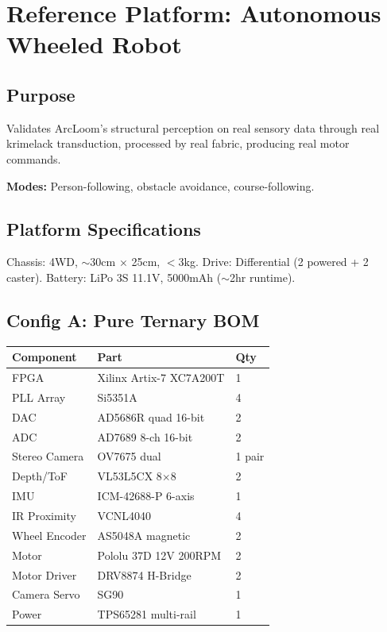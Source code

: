 \documentclass[11pt, a4paper]{report}
\begin{document}
\chapter{Reference Platform: Autonomous Wheeled Robot}

\section{Purpose}

Validates ArcLoom's structural perception on real sensory data through
real krimelack transduction, processed by real fabric, producing real
motor commands.

\textbf{Modes:} Person-following, obstacle avoidance, course-following.

\section{Platform Specifications}

Chassis: 4WD, $\sim$30cm $\times$ 25cm, $<$3kg.
Drive: Differential (2 powered + 2 caster).
Battery: LiPo 3S 11.1V, 5000mAh ($\sim$2hr runtime).

\section{Config A: Pure Ternary BOM}

\begin{center}
\begin{tabular}{@{}lll@{}}
\toprule
\textbf{Component} & \textbf{Part} & \textbf{Qty} \\
\midrule
FPGA & Xilinx Artix-7 XC7A200T & 1 \\
PLL Array & Si5351A & 4 \\
DAC & AD5686R quad 16-bit & 2 \\
ADC & AD7689 8-ch 16-bit & 2 \\
Stereo Camera & OV7675 dual & 1 pair \\
Depth/ToF & VL53L5CX 8$\times$8 & 2 \\
IMU & ICM-42688-P 6-axis & 1 \\
IR Proximity & VCNL4040 & 4 \\
Wheel Encoder & AS5048A magnetic & 2 \\
Motor & Pololu 37D 12V 200RPM & 2 \\
Motor Driver & DRV8874 H-Bridge & 2 \\
Camera Servo & SG90 & 1 \\
Power & TPS65281 multi-rail & 1 \\
\bottomrule
\end{tabular}
\end{center}
\end{document}

